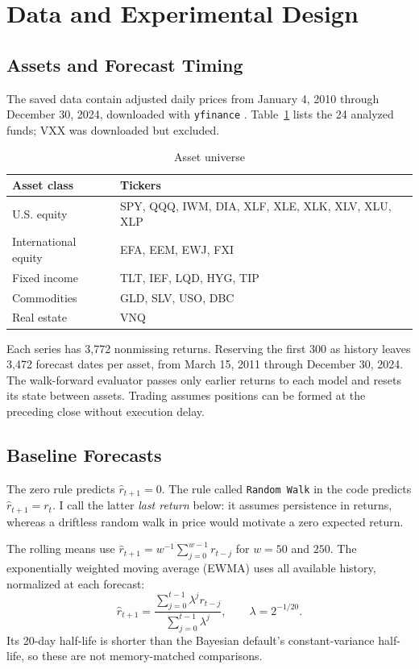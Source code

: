 \documentclass[conference]{IEEEtran}
\begin{document}
\section{Data and Experimental Design}
\subsection{Assets and Forecast Timing}
The saved data contain adjusted daily prices from January 4, 2010 through December 30, 2024, downloaded with \texttt{yfinance} \cite{yfinance}. Table~\ref{tab:universe} lists the 24 analyzed funds; VXX was downloaded but excluded.

\begin{table}[t]
\caption{Asset universe}
\label{tab:universe}
\centering\footnotesize
\begin{tabularx}{\columnwidth}{@{}lX@{}}
\toprule
Asset class & Tickers\\
\midrule
U.S. equity & SPY, QQQ, IWM, DIA, XLF, XLE, XLK, XLV, XLU, XLP\\
International equity & EFA, EEM, EWJ, FXI\\
Fixed income & TLT, IEF, LQD, HYG, TIP\\
Commodities & GLD, SLV, USO, DBC\\
Real estate & VNQ\\
\bottomrule
\end{tabularx}
\end{table}

Each series has 3,772 nonmissing returns. Reserving the first 300 as history leaves 3,472 forecast dates per asset, from March 15, 2011 through December 30, 2024. The walk-forward evaluator passes only earlier returns to each model and resets its state between assets. Trading assumes positions can be formed at the preceding close without execution delay.

\subsection{Baseline Forecasts}
The zero rule predicts $\hat r_{t+1}=0$. The rule called \texttt{Random Walk} in the code predicts $\hat r_{t+1}=r_t$. I call the latter \emph{last return} below: it assumes persistence in returns, whereas a driftless random walk in price would motivate a zero expected return.

The rolling means use $\hat r_{t+1}=w^{-1}\sum_{j=0}^{w-1}r_{t-j}$ for $w=50$ and $250$. The exponentially weighted moving average (EWMA) uses all available history, normalized at each forecast:
\begin{equation}
 \hat r_{t+1}=\frac{\sum_{j=0}^{t-1}\lambda^j r_{t-j}}
 {\sum_{j=0}^{t-1}\lambda^j},\qquad \lambda=2^{-1/20}.
\end{equation}
Its 20-day half-life is shorter than the Bayesian default's constant-variance half-life, so these are not memory-matched comparisons.
\end{document}
